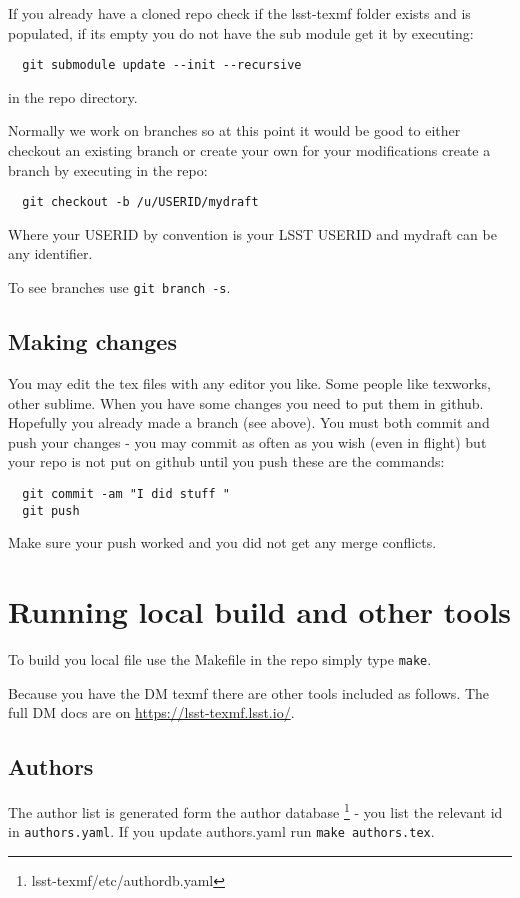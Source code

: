 If you already have a cloned repo check if the lsst-texmf folder exists and is populated, if its empty
you do not have the sub module get it by executing:

\begin{verbatim}
  git submodule update --init --recursive
\end{verbatim}

in the repo directory.


Normally we work on branches so at this point it would be good to either checkout an existing branch or
create your own for your modifications create a branch by executing in the repo:
\begin{verbatim}
  git checkout -b /u/USERID/mydraft
\end{verbatim}
Where your USERID by convention is your LSST USERID and mydraft can be any identifier.

To see branches use \texttt{git branch -s}.

\subsection{Making changes}
You may edit the tex files with any editor you like. Some people like texworks, other sublime.
When you have some changes you need to put them in github. Hopefully you already made a branch (see above).
You must both commit and push your changes - you may commit as often as you wish (even in flight) but your repo is
not put on github until you push these are the commands:
\begin{verbatim}
  git commit -am "I did stuff "
  git push
\end{verbatim}

Make sure your push worked and you did not get any merge conflicts.

\section{Running local build and other tools}
To build you local file use the Makefile in the repo simply type \texttt{make}.

Because you have the DM texmf there are other tools included as follows.
The full DM docs are on \url{https://lsst-texmf.lsst.io/}.

\subsection{Authors}
The author list is generated form the author database \footnote{lsst-texmf/etc/authordb.yaml} - you list the relevant id in \texttt{authors.yaml}.
If you update authors.yaml run \texttt{make authors.tex}.

